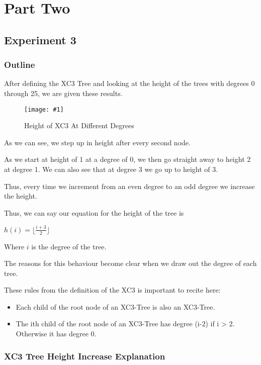 \documentclass{article}
\newcommand{\figureInsetScaled}[3]
{
    \FloatBarrier{}
    \figureRaw{#1}{#2}{#3}
    \FloatBarrier{}
}
\newcommand{\figureRaw}[3]
{
    \begin{figure}[ht!]
        \centering
        \texttt{[image: \#1]}
        \caption{#2}
    \end{figure}
}
\begin{document}
\newpage
\section{Part Two}
\subsection{Experiment 3}

\subsubsection{Outline}

After defining the XC3 Tree and looking at the height of the trees with degrees 0 through 25, we are given these results.

\figureInsetScaled{images/experiment3/Figure_1.png}{Height of XC3 At Different Degrees}{0.65}

As we can see, we step up in height after every second node.

As we start at height of 1 at a degree of 0, we then go straight away to height 2 at degree 1. We can also see that at degree 3 we go up to height of 3.

Thus, every time we increment from an even degree to an odd degree we increase the height.

Thus, we can say our equation for the height of the tree is 
\\
{
\Large
\begin{center}
    $h(i) = \lfloor \frac{i+3}{2} \rfloor$\\
    $ $
\end{center}
}
Where $i$ is the degree of the tree.

The reasons for this behaviour become clear when we draw out the degree of each tree.


These rules from the definition of the XC3 is important to recite here:

\begin{itemize}
    \item Each child of the root node of an XC3-Tree is also an XC3-Tree.
    \item The ith child of the root node of an XC3-Tree has degree (i-2) if i > 2. Otherwise it has degree 0.
\end{itemize}

\subsubsection{XC3 Tree Height Increase Explanation}
\end{document}
